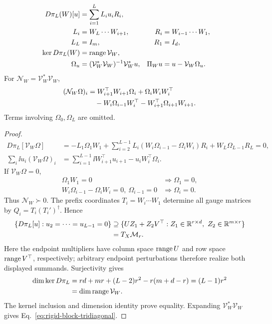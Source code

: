 \begin{proposition}
\label{prop:joint-chain}
\begin{align}
D\pi_L(W)[u]&=\sum_{i=1}^L L_i u_i R_i,\\
L_i&=W_L\cdots W_{i+1},&
R_i&=W_{i-1}\cdots W_1,\\
L_L&=I_m,&R_1&=I_d,\\
\ker D\pi_L(W)&=\operatorname{range}\mathcal V_W,\\
\Omega_u&=(\mathcal V_W^*\mathcal V_W)^{-1}\mathcal V_W^*u,&
\Pi_Wu&=u-\mathcal V_W\Omega_u .
\end{align}
For $\mathcal N_W=\mathcal V_W^*\mathcal V_W$,
\begin{align}
(\mathcal N_W\Omega)_i
&=W_{i+1}^\top W_{i+1}\Omega_i+\Omega_iW_iW_i^\top\notag\\
&\quad-W_i\Omega_{i-1}W_i^\top
-W_{i+1}^\top\Omega_{i+1}W_{i+1}.
\label{eq:rigid-block-tridiagonal}
\end{align}
Terms involving $\Omega_0,\Omega_L$ are omitted.
\end{proposition}
\begin{proof}
\begin{align}
D\pi_L[\mathcal V_W\Omega]
&=-L_1\Omega_1W_1
+\sum_{i=2}^{L-1}L_i(W_i\Omega_{i-1}-\Omega_iW_i)R_i
+W_L\Omega_{L-1}R_L=0,\\
\sum_i\ii{u_i}{(\mathcal V_W\Omega)_i}
&=\sum_{i=1}^{L-1}
\ii{W_{i+1}^\top u_{i+1}-u_iW_i^\top}{\Omega_i}.
\end{align}
If $\mathcal V_W\Omega=0$,
\begin{align}
\Omega_1W_1=0&\Longrightarrow\Omega_1=0,\\
W_i\Omega_{i-1}-\Omega_iW_i=0,\ \Omega_{i-1}=0
&\Longrightarrow\Omega_i=0.
\end{align}
Thus $\mathcal N_W\succ0$. The prefix coordinates
$T_i=W_i\cdots W_1$ determine all gauge matrices by
$Q_i=T_i(T_i')^\dagger$. Hence
\begin{align}
\{D\pi_L[u]:u_2=\cdots=u_{L-1}=0\}
&\supseteq\{UZ_1+Z_2V^\top:Z_1\in\mathbb R^{r\times d},\
Z_2\in\mathbb R^{m\times r}\}\\
&=T_X\mathcal M_r .
\end{align}
Here the endpoint multipliers have column space $\operatorname{range} U$ and row
space $\operatorname{range} V^\top$, respectively; arbitrary endpoint perturbations
therefore realize both displayed summands. Surjectivity gives
\begin{align}
\dim\ker D\pi_L
&=rd+mr+(L-2)r^2-r(m+d-r)=(L-1)r^2\\
&=\dim\operatorname{range}\mathcal V_W .
\end{align}
The kernel inclusion and dimension identity prove equality.
Expanding $\mathcal V_W^*\mathcal V_W$ gives
Eq.~\eqref{eq:rigid-block-tridiagonal}.
\end{proof}

